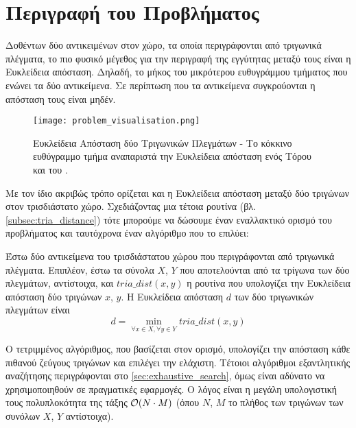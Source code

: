 \section{Περιγραφή του Προβλήματος}
Δοθέντων δύο αντικειμένων στον χώρο, τα οποία περιγράφονται από 
τριγωνικά πλέγματα, το πιο φυσικό μέγεθος για την περιγραφή της 
εγγύτητας μεταξύ τους είναι η Ευκλείδεια απόσταση. 
Δηλαδή, το μήκος του μικρότερου ευθυγράμμου τμήματος που ενώνει 
τα δύο αντικείμενα. Σε περίπτωση που τα αντικείμενα συγκρούονται 
η απόσταση τους είναι μηδέν.

\begin{figure}[h]
    \centering
    \texttt{[image: problem\_visualisation.png]}
    \caption[Οπτική Αναπαράσταση του Προβλήματος]{
        Ευκλείδεια Απόσταση δύο Τριγωνικών Πλεγμάτων - 
        Το κόκκινο ευθύγραμμο τμήμα αναπαριστά την Ευκλείδεια
        απόσταση ενός Τόρου και του .  
    }
\end{figure}

Με τον ίδιο ακριβώς τρόπο ορίζεται και η Ευκλείδεια απόσταση 
μεταξύ δύο τριγώνων στον τρισδιάστατο χώρο. 
Σχεδιάζοντας μια τέτοια ρουτίνα (βλ. \ref{subsec:tria_distance}) 
τότε μπορούμε να δώσουμε έναν εναλλακτικό ορισμό του προβλήματος
και ταυτόχρονα έναν αλγόριθμο που το επιλύει: 

\begin{definition}
    Έστω δύο αντικείμενα του τρισδιάστατου χώρου που περιγράφονται 
    από τριγωνικά πλέγματα. Επιπλέον, έστω τα σύνολα $X$, $Y$ που 
    αποτελούνται από τα τρίγωνα των δύο πλεγμάτων, αντίστοιχα, και 
    $tria\_dist(x,y)$ η ρουτίνα που υπολογίζει την Ευκλείδεια απόσταση
    δύο τριγώνων $x$, $y$.
    Η Ευκλείδεια απόσταση $d$ των δύο τριγωνικών πλεγμάτων είναι
    \[ d = \min_{\forall x \in X, \forall y \in Y} tria\_dist(x,y) \]    
\end{definition}

Ο τετριμμένος αλγόριθμος, που βασίζεται στον ορισμό, υπολογίζει την απόσταση 
κάθε πιθανού ζεύγους τριγώνων και επιλέγει την ελάχιστη. Τέτοιοι αλγόριθμοι 
εξαντλητικής αναζήτησης περιγράφονται στο \ref{sec:exhaustive_search}, όμως
είναι αδύνατο να χρησιμοποιηθούν σε πραγματικές εφαρμογές. O λόγος είναι η μεγάλη
υπολογιστική τους πολυπλοκότητα της τάξης $\mathcal{O}(N \cdot M)$ (όπου $N$, $M$ το 
πλήθος των τριγώνων των συνόλων $X$, $Y$ αντίστοιχα).

